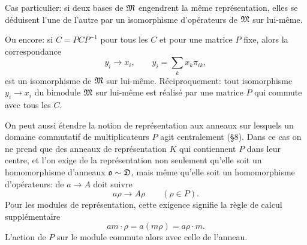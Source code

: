 Cas particulier: si deux bases de $\mathfrak{M}$ engendrent la même représentation, elles se déduisent l'une de l'autre par un isomorphisme d'opérateurs de $\mathfrak{M}$ sur lui-même.

Ou encore: si $C=PCP^{-1}$ pour tous les $C$ et pour une matrice $P$ fixe, alors la correspondance
\[
        y_i\to x_i,
        \qquad y_i=\sum_kx_k\pi_{ik},
\]
est un isomorphisme de $\mathfrak{M}$ sur lui-même. Réciproquement: tout isomorphisme $y_i\to x_i$ du bimodule $\mathfrak{M}$ sur lui-même est réalisé par une matrice $P$ qui commute avec tous les $C$.

On peut aussi étendre la notion de représentation aux anneaux sur lesquels un domaine commutatif de multiplicateurs $P$ agit centralement (\S{}8). Dans ce cas on ne prend que des anneaux de représentation $K$ qui contiennent $P$ dans leur centre, et l'on exige de la représentation non seulement qu'elle soit un homomorphisme d'anneaux $\mathfrak{o}\sim\mathfrak D$, mais même qu'elle soit un homomorphisme d'opérateurs: de $a\to A$ doit suivre
\[
        a\rho\to A\rho\qquad(\rho\in P).
\]
Pour les modules de représentation, cette exigence signifie la règle de calcul supplémentaire
\[
        am\cdot\rho=a(m\rho)=a\rho\cdot m.
\]
L'action de $P$ sur le module commute alors avec celle de l'anneau.
